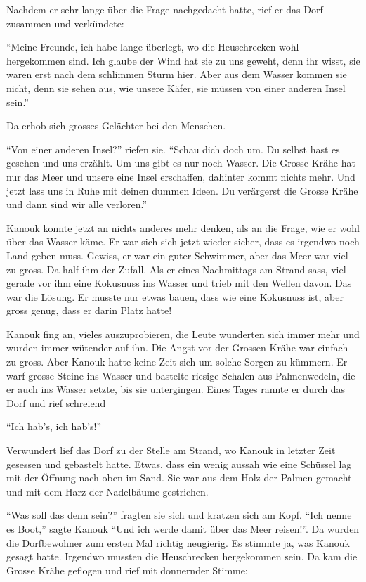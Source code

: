 Nachdem er sehr lange über die Frage nachgedacht hatte, rief er das Dorf zusammen und verkündete:

\enquote{Meine Freunde, ich habe lange überlegt, wo die Heuschrecken wohl hergekommen sind. Ich glaube der Wind hat sie zu uns geweht, denn ihr wisst, sie waren erst nach dem schlimmen Sturm hier. Aber aus dem Wasser kommen sie nicht, denn sie sehen aus, wie unsere Käfer, sie müssen von einer anderen Insel sein.}

Da erhob sich grosses Gelächter bei den Menschen.

\enquote{Von einer anderen Insel?} riefen sie. \enquote{Schau dich doch um. Du selbst hast es gesehen und uns erzählt. Um uns gibt es nur noch Wasser. Die Grosse Krähe hat nur das Meer und unsere eine Insel erschaffen, dahinter kommt nichts mehr. Und jetzt lass uns in Ruhe mit deinen dummen Ideen. Du verärgerst die Grosse Krähe und dann sind wir alle verloren.}

Kanouk konnte jetzt an nichts anderes mehr denken, als an die Frage, wie er wohl über das Wasser käme. Er war sich sich jetzt wieder sicher, dass es irgendwo noch Land geben muss. Gewiss, er war ein guter Schwimmer, aber das Meer war viel zu gross. Da half ihm der Zufall. Als er eines Nachmittags am Strand sass, viel gerade vor ihm eine Kokusnuss ins Wasser und trieb mit den Wellen davon. Das war die Lösung. Er musste nur etwas bauen, dass wie eine Kokusnuss ist, aber gross genug, dass er darin Platz hatte!

Kanouk fing an, vieles auszuprobieren, die Leute wunderten sich immer mehr und wurden immer wütender auf ihn. Die Angst vor der Grossen Krähe war einfach zu gross. Aber Kanouk hatte keine Zeit sich um solche Sorgen zu kümmern. Er warf grosse Steine ins Wasser und bastelte riesige Schalen aus Palmenwedeln, die er auch ins Wasser setzte, bis sie untergingen. Eines Tages rannte er durch das Dorf und rief schreiend 

\enquote{Ich hab's, ich hab's!}

Verwundert lief das Dorf zu der Stelle am Strand, wo Kanouk in letzter Zeit gesessen und gebastelt hatte. Etwas, dass ein wenig aussah wie eine Schüssel lag mit der Öffnung nach oben im Sand. Sie war aus dem Holz der Palmen gemacht und mit dem Harz der Nadelbäume gestrichen. 

\enquote{Was soll das denn sein?} fragten sie sich und kratzen sich am Kopf. \enquote{Ich nenne es Boot,} sagte Kanouk \enquote{Und ich werde damit über das Meer reisen!}. Da wurden die Dorfbewohner zum ersten Mal richtig neugierig. Es stimmte ja, was Kanouk gesagt hatte. Irgendwo mussten die Heuschrecken hergekommen sein. Da kam die Grosse Krähe geflogen und rief mit donnernder Stimme:

